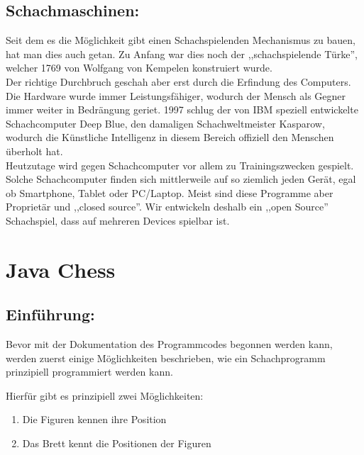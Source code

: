 \documentclass[12pt,a4paper]{article}
\begin{document}
{%

\subsection{Schachmaschinen:}

Seit dem es die Möglichkeit gibt einen Schachspielenden Mechanismus zu bauen, hat man dies auch getan. Zu Anfang war dies noch der ,,schachspielende Türke'', welcher 1769 von Wolfgang von Kempelen konstruiert wurde. \\ 
Der richtige Durchbruch geschah aber erst durch die Erfindung des Computers. Die Hardware wurde immer Leistungsfähiger, wodurch der Mensch als Gegner immer weiter in Bedrängung geriet. 1997 schlug der von IBM speziell entwickelte Schachcomputer Deep Blue, den damaligen Schachweltmeister Kasparow, wodurch die Künstliche Intelligenz in diesem Bereich offiziell den Menschen überholt hat. \\
Heutzutage wird gegen Schachcomputer vor allem zu Trainingszwecken gespielt. Solche Schachcomputer finden sich mittlerweile auf so ziemlich jeden Gerät, egal ob Smartphone, Tablet oder PC/Laptop. Meist sind diese Programme aber Proprietär und ,,closed source''. Wir entwickeln deshalb ein ,,open Source'' Schachspiel, dass auf mehreren Devices spielbar ist.
 



 
\clearpage\vfill\newpage{}

\section{Java Chess}
\subsection{Einführung:}

Bevor mit der Dokumentation des Programmcodes begonnen werden kann, werden zuerst einige Möglichkeiten beschrieben, wie ein Schachprogramm prinzipiell programmiert werden kann.

Hierfür gibt es prinzipiell zwei Möglichkeiten:
\begin{enumerate}
	\item{Die Figuren kennen ihre Position}
	\item{Das Brett kennt die Positionen der Figuren}
\end{enumerate}

}
\end{document}
